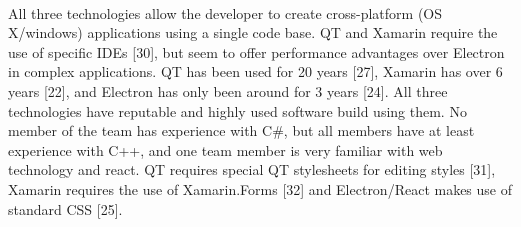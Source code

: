 \documentclass[10pt,draftclsnofoot,onecolumn]{IEEEtran}
\newcommand\tab[1][1cm]{\hspace*{#1}}
\begin{document}
\\
\tab \tab {\Medium\textbf{e. Discussion:  }}All three technologies allow the developer to create cross-platform (OS X/windows) \tab \tab \tab applications using a single code base. QT and Xamarin require the use of specific IDEs \tab \tab \tab [29][30], but seem to offer performance advantages over Electron in complex applications. QT \tab \tab \tab has been used for 20 years [27], Xamarin has over 6 years [22], and Electron has only been \tab \tab \tab around for 3 years [24]. All three technologies have reputable and highly used software build \tab \tab \tab using them. No member of the team has experience with C#, but all members have at least \tab \tab \tab experience with C++, and one team member is very familiar with web technology and react. \tab \tab \tab QT requires special QT stylesheets for editing styles [31], Xamarin requires the use of \newline \tab \tab \tab Xamarin.Forms [32] and Electron/React makes use of standard CSS [25].\\
\end{document}
